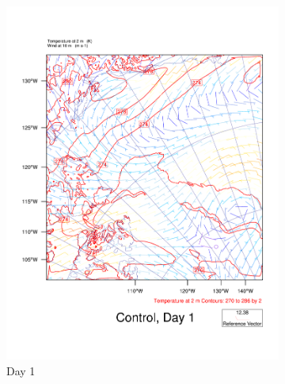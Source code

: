 \begin{figure}
    \centering
    \begin{subfigure}{0.48\textwidth}
        \centering
        \includegraphics[width=\textwidth]{results/control/T2UV10_Control_Day1.pdf}
        \caption{Day 1}
        \label{subfig:weather_cont_day1}
    \end{subfigure}
    \begin{subfigure}{0.48\textwidth}
        \centering

\end{subfigure}
\end{figure}

